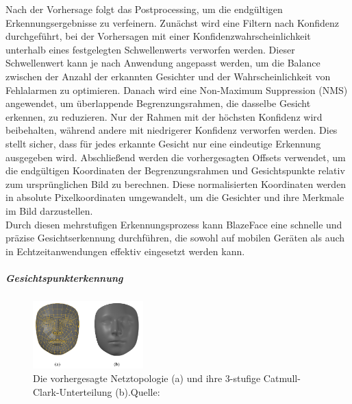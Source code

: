 Nach der Vorhersage folgt das Postprocessing, um die endgültigen Erkennungsergebnisse zu verfeinern. Zunächst wird eine Filtern nach Konfidenz durchgeführt, bei der Vorhersagen mit einer Konfidenzwahrscheinlichkeit unterhalb eines festgelegten Schwellenwerts verworfen werden. Dieser Schwellenwert kann je nach Anwendung angepasst werden, um die Balance zwischen der Anzahl der erkannten Gesichter und der Wahrscheinlichkeit von Fehlalarmen zu optimieren. Danach wird eine Non-Maximum Suppression (NMS) angewendet, um überlappende Begrenzungsrahmen, die dasselbe Gesicht erkennen, zu reduzieren. Nur der Rahmen mit der höchsten Konfidenz wird beibehalten, während andere mit niedrigerer Konfidenz verworfen werden. Dies stellt sicher, dass für jedes erkannte Gesicht nur eine eindeutige Erkennung ausgegeben wird. Abschließend werden die vorhergesagten Offsets verwendet, um die endgültigen Koordinaten der Begrenzungsrahmen und Gesichtspunkte relativ zum ursprünglichen Bild zu berechnen. Diese normalisierten Koordinaten werden in absolute Pixelkoordinaten umgewandelt, um die Gesichter und ihre Merkmale im Bild darzustellen. \\
Durch diesen mehrstufigen Erkennungsprozess kann BlazeFace eine schnelle und präzise Gesichtserkennung durchführen, die sowohl auf mobilen Geräten als auch in Echtzeitanwendungen effektiv eingesetzt werden kann.

\subparagraph{Gesichtspunkterkennung}

\begin{figure}
    \centering
    \includegraphics[width=0.38\textwidth]{data/mesh_topology.png}
    \caption{\footnotesize Die vorhergesagte Netztopologie (a) und ihre 3-stufige Catmull-Clark-Unterteilung (b).\newline Quelle: \cite{Kartynnik.2019}}
\end{figure}

